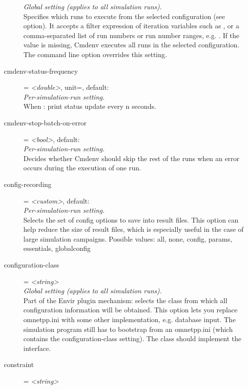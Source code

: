 \begin{description}
    \textit{Global setting (applies to all simulation runs).}\\
    Specifies which runs to execute from the selected configuration (see
     option). It accepts a
    filter expression of iteration variables such as , or
    a comma-separated list of run numbers or run number ranges, e.g.
    . If
    the value is missing, Cmdenv executes all runs in the selected
    configuration. The  command line option overrides this
    setting.
\item[cmdenv-status-frequency] = \textit{<double>}, unit=, default: \\
    \textit{Per-simulation-run setting.}\\
    When :
    print status update every n seconds.
\item[cmdenv-stop-batch-on-error] = \textit{<bool>}, default: \\
    \textit{Per-simulation-run setting.}\\
    Decides whether Cmdenv should skip the rest of the runs when an error
    occurs during the execution of one run.
\item[config-recording] = \textit{<custom>}, default: \\
    \textit{Per-simulation-run setting.}\\
    Selects the set of config options to save into result files. This option
    can help reduce the size of result files, which is especially useful in the
    case of large simulation campaigns. Possible values: all, none, config,
    params, essentials, globalconfig
\item[configuration-class] = \textit{<string>}\\
    \textit{Global setting (applies to all simulation runs).}\\
    Part of the Envir plugin mechanism: selects the class from which all
    configuration information will be obtained. This option lets you replace
    omnetpp.ini with some other implementation, e.g. database input. The
    simulation program still has to bootstrap from an omnetpp.ini (which
    contains the configuration-class setting). The class should implement the
     interface.
\item[constraint] = \textit{<string>}\\

\end{description}
